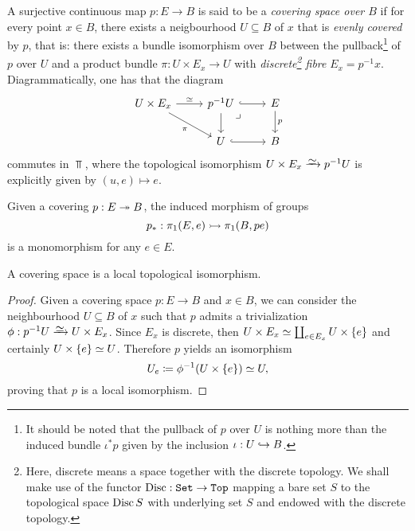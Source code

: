 \begin{definition}
\label{def:covering-space}
A surjective continuous map \(p: E \to B\) is said to be a \emph{covering space
  over \(B\)} if for every point \(x \in B\), there exists a neigbourhood
\(U \subseteq B\) of \(x\) that is \emph{evenly covered} by \(p\), that is:
there exists a bundle isomorphism over \(B\) between the pullback\footnote{It
  should be noted that the pullback of \(p\) over \(U\) is nothing more than the
  induced bundle \(\iota^{*} p\) given by the inclusion \(\iota: U \hookrightarrow B\).} of
\(p\) over \(U\) and a product bundle \(\pi: U \times E_x \to U\) with
\emph{discrete\footnote{Here, discrete means a space together with the discrete
    topology. We shall make use of the functor \(\operatorname{Disc}: {\texttt{Set}} \to {\texttt{Top}}\) mapping
    a bare set \(S\) to the topological space \(\operatorname{Disc} S\) with underlying set
    \(S\) and endowed with the discrete topology.} fibre}
\(E_x = p^{-1} x\). Diagrammatically, one has that the diagram
\[
\begin{tikzcd}
U \times E_x \ar[r, "\dis"] \ar[rd, "\pi"']
&p^{-1} U \ar[r, hook] \ar[d]
\ar[rd, "\lrcorner", phantom, very near start]
&E \ar[d, "p"] \\
&U \ar[r, hook] &B
\end{tikzcd}
\]
commutes in \(\Top\), where the topological isomorphism
\(U \times E_x \isoto p^{-1} U\) is explicitly given by \((u, e) \mapsto e\).
\end{definition}

\begin{corollary}
\label{cor:covering-induces-monomorphism-fundamental-grps}
Given a covering \(p: E \twoheadrightarrow B\), the induced morphism of groups
\[
p_{*}: \pi_1(E, e) \rightarrowtail \pi_1(B, p e)
\]
is a monomorphism for any \(e \in E\).
\end{corollary}

\begin{corollary}
\label{cor:covering-space-is-locally-top-iso}
A covering space is a local topological isomorphism.
\end{corollary}

\begin{proof}
Given a covering space \(p: E \to B\) and \(x \in B\), we can consider the
neighbourhood \(U \subseteq B\) of \(x\) such that \(p\) admits a trivialization
\(\phi: p^{-1} U \isoto U \times E_x\). Since \(E_x\) is discrete, then
\(U \times E_x \simeq \coprod_{e \in E_x} U \times \{e\}\) and certainly
\(U \times \{e\} \simeq U\). Therefore \(p\) yields an isomorphism
\begin{equation}\label{eq:covering-space-sheet}
U_e \coloneq \phi^{-1}(U \times \{e\}) \simeq U,
\end{equation}
proving that \(p\) is a local isomorphism.
\end{proof}

